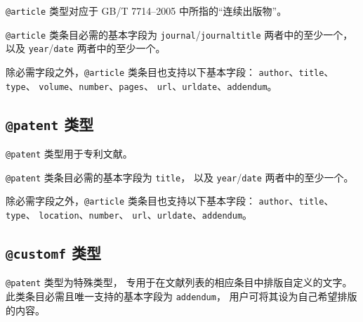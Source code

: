 \documentclass[UTF8, fancyhdr, hyperref]{ctexart}
\begin{document}
\verb|@article| 类型对应于 GB/T 7714--2005 中所指的“连续出版物”。

\verb|@article| 类条目必需的基本字段为
\verb|journal|/\verb|journaltitle| 两者中的至少一个，
以及 \verb|year|/\verb|date| 两者中的至少一个。

除必需字段之外，\verb|@article| 类条目也支持以下基本字段：
\verb|author|、\verb|title|、\verb|type|、
\verb|volume|、\verb|number|、\verb|pages|、
\verb|url|、\verb|urldate|、\verb|addendum|。

\subsection{\texttt{@patent} 类型}

\verb|@patent| 类型用于专利文献。

\verb|@patent| 类条目必需的基本字段为 \verb|title|，
以及 \verb|year|/\verb|date| 两者中的至少一个。

除必需字段之外，\verb|@article| 类条目也支持以下基本字段：
\verb|author|、\verb|title|、\verb|type|、
\verb|location|、\verb|number|、
\verb|url|、\verb|urldate|、\verb|addendum|。

\subsection{\texttt{@customf} 类型}

\verb|@patent| 类型为特殊类型，
专用于在文献列表的相应条目中排版自定义的文字。
此类条目必需且唯一支持的基本字段为 \verb|addendum|，
用户可将其设为自己希望排版的内容。

\printbibliography%
	[heading = bibnumbered, title = {本文参考文献}, category = cited]
\printbibliography%
	[heading = bibnumbered, title = {其它参考文献示例}, notcategory = cited]
\end{document}
